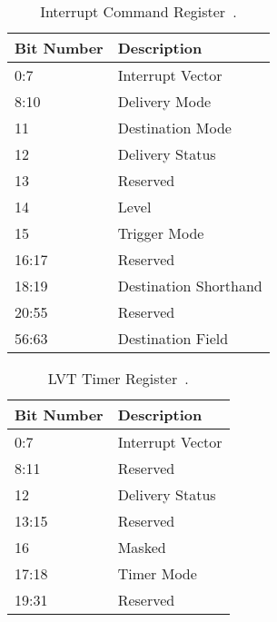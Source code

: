 \begin{table}[H]
  \centering
  \begin{tabularx}{1.0\textwidth}{| X | X |}
    \hline
    \textbf{Bit Number} & \textbf{Description}  \\ \hline\hline
    0:7                 & Interrupt Vector      \\ \hline
    8:10                & Delivery Mode         \\ \hline
    11                  & Destination Mode      \\ \hline
    12                  & Delivery Status       \\ \hline
    13                  & Reserved              \\ \hline
    14                  & Level                 \\ \hline
    15                  & Trigger Mode          \\ \hline
    16:17               & Reserved              \\ \hline
    18:19               & Destination Shorthand \\ \hline
    20:55               & Reserved              \\ \hline
    56:63               & Destination Field     \\ \hline
  \end{tabularx}
  \caption{Interrupt Command Register~\autocite[sec.~3.11.6.1]{ia32}.}
  \label{tab:lapicregsicr}
\end{table}

\begin{table}[H]
  \centering
  \begin{tabularx}{1.0\textwidth}{| X | X |}
    \hline
    \textbf{Bit Number} & \textbf{Description} \\ \hline\hline
    0:7                 & Interrupt Vector     \\ \hline
    8:11                & Reserved             \\ \hline
    12                  & Delivery Status      \\ \hline
    13:15               & Reserved             \\ \hline
    16                  & Masked               \\ \hline
    17:18               & Timer Mode           \\ \hline
    19:31               & Reserved             \\ \hline
  \end{tabularx}
  \caption{LVT Timer Register~\autocite[sec.~3.11.5.1]{ia32}.}
  \label{tab:lapicregslvtt}
\end{table}

